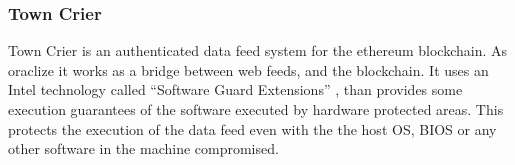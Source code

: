 \subsubsection{Town Crier}
Town Crier \cite{zhang2016town} is an authenticated data feed system for
  the ethereum blockchain.
As oraclize it works as a bridge between web feeds, and the blockchain.
It uses an Intel technology called ``Software Guard Extensions''
  \cite{costan2016intel}, than provides some execution guarantees of the software
  executed by hardware protected areas.
This protects the execution of the data feed even with the the host OS, BIOS or
  any other software in the machine compromised.
